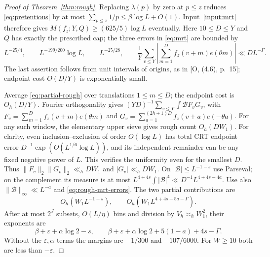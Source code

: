 \documentclass[11pt]{article}
\theoremstyle{definition}
\theoremstyle{remark}
\numberwithin{equation}{section}
\newcommand{\eps}{\varepsilon}
\begin{document}
\begin{proof}[Proof of Theorem~\ref{thm:rough}]
Replacing $\lambda(p)$ by zero at $p\le z$ reduces \eqref{eq:pretentious} by at most
$\sum_{p\le z}1/p\le\beta\log L+O(1)$.
Input~\ref{input:mrt} therefore gives $M(f_z;Y,Q)\ge(625/5)\log L$ eventually.
Here $10\le D\le Y$ and $Q$ has exactly the prescribed cap; the three errors in \eqref{eq:mrt} are bounded by
\begin{equation}\label{eq:rough-mrt-errors}
 L^{-25/4},\qquad L^{-199/200}\log L,\qquad L^{-25/28},
 \qquad \frac1Y\sum_{v\le Y}\left|\sum_{m=1}^D f_z(v+m)e(\theta m)\right|\ll D L^{-\Gamma}.
\end{equation}
The last assertion follows from unit intervals of origins, as in [O, (4.6), p.~15]; endpoint cost $O(D/Y)$ is
exponentially small.

Average \eqref{eq:partial-rough} over translations $1\le m\le D$; the endpoint cost is $O_h(D/Y)$.
Fourier orthogonality gives $(YD)^{-1}\sum_{v\le Y}\int\mathcal B F_vG_v$, with
$F_v=\sum_{m=1}^D f_z(v+m)e(\theta m)$ and
$G_v=\sum_{a=1}^{(2h+1)D}f_z(v+a)e(-\theta a)$.
For any such window, the elementary upper sieve gives rough count $O_h(DW_1)$.
For clarity, even inclusion--exclusion of order $O(\log L)$ has total CRT endpoint error
$D^{-1}\exp(O(L^{1/6}\log L))$, and its independent remainder can be any fixed negative power of $L$.
This verifies the uniformity even for the smallest $D$.
Thus $\|F_v\|_2\|G_v\|_2\ll_h DW_1$ and $|G_v|\ll_h DW_1$.
On $|\mathcal B|\le L^{-1-s}$ use Parseval; on the complement its measure is at most
$L^{4+4s}\int|\mathcal B|^4\ll D^{-1}L^{4+4s-4a}$.
Use also $\|\mathcal B\|_\infty\ll L^{-a}$ and \eqref{eq:rough-mrt-errors}. The two partial contributions are
\begin{equation}\label{eq:rough-centering-pieces}
 O_h(W_1L^{-1-s}),\qquad O_h(W_1L^{4+4s-5a-\Gamma}).
\end{equation}
After at most $2^J$ subsets, $O(L/\eta)$ bins and division by $V_h\asymp_h W_1^2$, their exponents are
\begin{equation}\label{eq:rough-centering-exponents}
 \beta+\eps+\alpha\log2-s,\qquad
 \beta+\eps+\alpha\log2+5(1-a)+4s-\Gamma.
\end{equation}
Without the $\eps,\alpha$ terms the margins are $-1/300$ and $-107/6000$.
For $W\ge10$ both are less than $-\eps$.


\end{proof}
\end{document}
